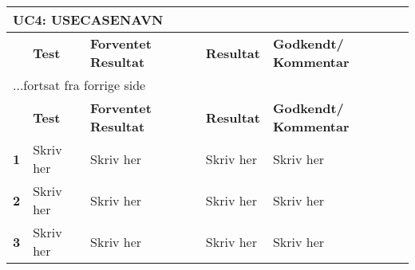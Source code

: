 \begin{center}
	\label{accepttest:uc4} 
\begin{longtable}{|p{}|p{}|p{}|p{}|p{}|} %
\hline
\multicolumn{5}{|l|}{\textbf{UC4: USECASENAVN}} \\ \hline
\multicolumn{1}{|c|}{} &
\textbf{Test} &
\textbf{Forventet \newline Resultat} &
\textbf{Resultat} &
\textbf{Godkendt/ \newline Kommentar} \\ \hline 
\endfirsthead

\multicolumn{5}{l}{...fortsat fra forrige side} \\ \hline 
\multicolumn{1}{|c|}{} &
\textbf{Test} &
\textbf{Forventet \newline Resultat} &
\textbf{Resultat} &
\textbf{Godkendt/ \newline Kommentar} \\ \hline 
\endhead



\textbf{1}	&Skriv her
			&Skriv her
			&Skriv her
			&Skriv her 
			\\\hline

\textbf{2}	&Skriv her
			&Skriv her
			&Skriv her
			&Skriv her 
			\\\hline
			 
\textbf{3}	&Skriv her
			&Skriv her
			&Skriv her
			&Skriv her
			\\\hline

\end{longtable}
\end{center}